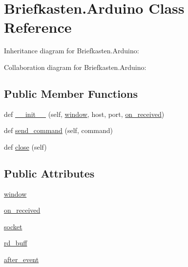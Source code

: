 \hypertarget{class_briefkasten_1_1_arduino}{}\section{Briefkasten.\+Arduino Class Reference}
\label{class_briefkasten_1_1_arduino}


Inheritance diagram for Briefkasten.\+Arduino\+:


Collaboration diagram for Briefkasten.\+Arduino\+:
\subsection*{Public Member Functions}
\begin{DoxyCompactItemize}
\item 
def \mbox{\hyperlink{class_briefkasten_1_1_arduino_a1a4acf66e303bcedd768975f12ac8413}{\+\_\+\+\_\+init\+\_\+\+\_\+}} (self, \mbox{\hyperlink{class_briefkasten_1_1_arduino_a773f95c6d9aaea09cfbfaace3aeca591}{window}}, host, port, \mbox{\hyperlink{class_briefkasten_1_1_arduino_a214b225d50856249ac07b2d7c4d7aadc}{on\+\_\+received}})
\item 
def \mbox{\hyperlink{class_briefkasten_1_1_arduino_a152ea6889c5bce819fb62295f54a1e99}{send\+\_\+command}} (self, command)
\item 
def \mbox{\hyperlink{class_briefkasten_1_1_arduino_a1091947726bebecead5bd7cff230cd3a}{close}} (self)
\end{DoxyCompactItemize}
\subsection*{Public Attributes}
\begin{DoxyCompactItemize}
\item 
\mbox{\hyperlink{class_briefkasten_1_1_arduino_a773f95c6d9aaea09cfbfaace3aeca591}{window}}
\item 
\mbox{\hyperlink{class_briefkasten_1_1_arduino_a214b225d50856249ac07b2d7c4d7aadc}{on\+\_\+received}}
\item 
\mbox{\hyperlink{class_briefkasten_1_1_arduino_a0c9e1ed7ae51461c80ea05c9834264d1}{socket}}
\item 
\mbox{\hyperlink{class_briefkasten_1_1_arduino_a1d817a39c7040a6e77f18f76caa6023c}{rd\+\_\+buff}}
\item 
\mbox{\hyperlink{class_briefkasten_1_1_arduino_ae9501b5536008e9d432209549515e710}{after\+\_\+event}}
\end{DoxyCompactItemize}


